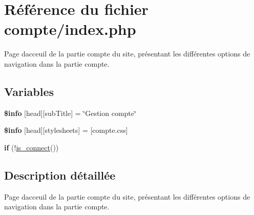\hypertarget{compte_2index_8php}{}\section{Référence du fichier compte/index.php}
\label{compte_2index_8php}


Page d\textquotesingle{}acceuil de la partie compte du site, présentant les différentes options de navigation dans la partie compte.  


\subsection*{Variables}
\begin{DoxyCompactItemize}
\item 
\mbox{\label{compte_2index_8php_a024f87f9bf4f3b33710e2e7ff8f60823}} 
{\bfseries \$info} \mbox{[}\textquotesingle{}head\textquotesingle{}\mbox{]}\mbox{[}\textquotesingle{}sub\+Title\textquotesingle{}\mbox{]} = \char`\"{}Gestion compte\char`\"{}
\item 
\mbox{\label{compte_2index_8php_af6044c8bf78ebc8c58057e14d7738bbd}} 
{\bfseries \$info} \mbox{[}\textquotesingle{}head\textquotesingle{}\mbox{]}\mbox{[}\textquotesingle{}stylesheets\textquotesingle{}\mbox{]} = \mbox{[}\textquotesingle{}compte.\+css\textquotesingle{}\mbox{]}
\item 
\mbox{\label{compte_2index_8php_ad1af639d5e5ef1cab9154530df13b264}} 
{\bfseries if} (!\hyperlink{fonctionCompte_8php_a2fe594e0482307b8729ea37780d6f74b}{is\+\_\+connect}())
\end{DoxyCompactItemize}


\subsection{Description détaillée}
Page d\textquotesingle{}acceuil de la partie compte du site, présentant les différentes options de navigation dans la partie compte. 

